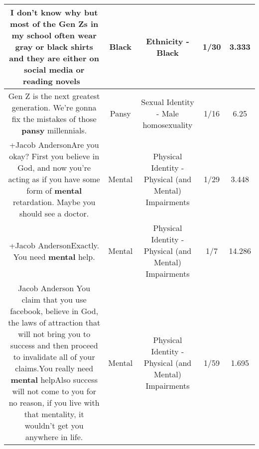 \documentclass[11pt]{article}
\newlength\mylength
\begin{document}
\begin{center}
\begin{longtable}{|C{.65\mylength}|C{.30\mylength}|C{.12\mylength}|C{.12\mylength}|C{.12\mylength}|}
  \small I don't know why but most of the Gen Zs in my school often wear gray or \textbf{black} shirts and they are either on social media or reading novels 🤔\normalsize   & Black & Ethnicity - Black & 1/30 & 3.333 \\  \hline
  \small Gen Z is the next greatest generation. We're gonna fix the mistakes of those \textbf{pansy} millennials.\normalsize   & Pansy & Sexual Identity - Male homosexuality & 1/16 & 6.25 \\  \hline
  \small +Jacob AndersonAre you okay? First you believe in God, and now you're acting as if you have some form of \textbf{mental} retardation. Maybe you should see a doctor.\normalsize   & Mental & Physical Identity - Physical (and Mental) Impairments & 1/29 & 3.448 \\  \hline
  \small +Jacob AndersonExactly. You need \textbf{mental} help.\normalsize   & Mental & Physical Identity - Physical (and Mental) Impairments & 1/7 & 14.286 \\  \hline
  \small Jacob Anderson You claim that you use facebook, believe in God, the laws of attraction that will not bring you to success and then proceed to invalidate all of your claims.You really need \textbf{mental} helpAlso success will not come to you for no reason, if you live with that mentality, it wouldn't get you anywhere in life.\normalsize   & Mental & Physical Identity - Physical (and Mental) Impairments & 1/59 & 1.695 \\  \hline

\end{longtable}
\end{center}
\end{document}
